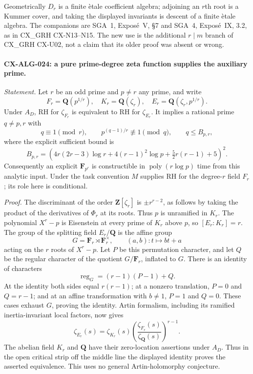 Geometrically $D_r$ is a finite \`etale coefficient algebra; adjoining
an $r$th root is a Kummer cover, and taking the displayed invariants
is descent of a finite \`etale algebra. The companions are SGA~1,
Expos\'e~V, \S7 and SGA~4, Expos\'e~IX, 3.2, as in CX\_GRH
CX-N13--N15. The new use is the additional $r\mid m$ branch of
CX\_GRH CX-U02, not a claim that its older proof was absent or wrong.

\paragraph{CX-ALG-024: a pure prime-degree zeta function supplies the auxiliary prime.}
\emph{Statement.} Let $r$ be an odd prime and $p\ne r$ any prime, and write
\[
 F_r=\mathbf Q(p^{1/r}),\quad K_r=\mathbf Q(\zeta_r),\quad
 E_r=\mathbf Q(\zeta_r,p^{1/r}).
\]
Under $A_D$, RH for $\zeta_{F_r}$ is equivalent to RH for
$\zeta_{E_r}$. It implies a rational prime $q\ne p,r$ with
\[
 q\equiv1\pmod r,\qquad p^{(q-1)/r}\not\equiv1\pmod q,
 \qquad q\le B_{p,r},
\]
where the explicit sufficient bound is
\[
 B_{p,r}=
 \left(4r(2r-3)\log r+4(r-1)^2\log p
                       +\tfrac52r(r-1)+5\right)^2.
\]
Consequently an explicit $\mathbf F_{p^r}$ is constructible in
$\operatorname{poly}(r\log p)$ time from this analytic input.
Under the task convention $M$ supplies RH for the degree-$r$ field
$F_r$; its role here is conditional.

\emph{Proof.} The discriminant of the order $\mathbf Z[\zeta_r]$ is
$\pm r^{r-2}$, as follows by taking the product of the derivatives
of $\Phi_r$ at its roots. Thus $p$ is unramified in $K_r$.
The polynomial $X^r-p$ is Eisenstein at every prime of $K_r$ above $p$,
so $[E_r:K_r]=r$. The group of the splitting field $E_r/\mathbf Q$
is the affine group
\[
             G=\mathbf F_r\rtimes\mathbf F_r^\times,
       \qquad (a,b):t\longmapsto bt+a
\]
acting on the $r$ roots of $X^r-p$.
Let $P$ be this permutation character, and let $Q$ be the regular
character of the quotient $G/\mathbf F_r$, inflated to $G$.
There is an identity of characters
\[
                    \operatorname{reg}_G=(r-1)(P-1)+Q.
\]
At the identity both sides equal $r(r-1)$; at a nonzero translation,
$P=0$ and $Q=r-1$; and at an affine transformation with $b\ne1$,
$P=1$ and $Q=0$. These cases exhaust $G$, proving the identity.
Artin formalism, including its ramified inertia-invariant local factors,
now gives
\[
          \zeta_{E_r}(s)=\zeta_{K_r}(s)
                    \left(\frac{\zeta_{F_r}(s)}{\zeta_{\mathbf Q}(s)}
                    \right)^{r-1}.
\]
The abelian field $K_r$ and $\mathbf Q$ have their zero-location
assertions under $A_D$. Thus in the open critical strip off the middle
line the displayed identity proves the asserted equivalence. This uses
no general Artin-holomorphy conjecture.

